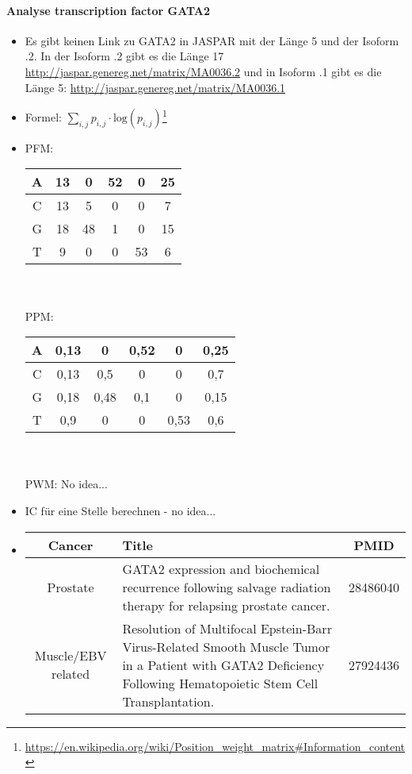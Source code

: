 \documentclass[a4paper,10pt]{article}
\begin{document}
	\parindent0pt
	\paragraph{Analyse transcription factor GATA2}
	\begin{itemize}
		\item Es gibt keinen Link zu GATA2 in JASPAR mit der Länge 5 und der Isoform .2. In der Isoform .2 gibt es die Länge 17 \url{http://jaspar.genereg.net/matrix/MA0036.2} und in Isoform .1 gibt es die Länge 5: \url{http://jaspar.genereg.net/matrix/MA0036.1}
		\item Formel: $\sum_{i,j}p_{i,j} \cdot \text{log}(p_{i,j})$\footnote{\url{https://en.wikipedia.org/wiki/Position_weight_matrix\#Information_content}}
		\item  PFM:	
		\begin{tabular}[t]{|c|c|c|c|c|c|}
			\hline 
			A & 13 & 0 & 52 & 0 & 25 \\ 
			\hline 
			C & 13 & 5 & 0 & 0 & 7 \\ 
			\hline 
			G & 18 & 48 & 1 & 0 & 15 \\ 
			\hline 
			T & 9 & 0 & 0 & 53 & 6 \\ 
			\hline 
		\end{tabular}\ \\\\
		PPM:
		\begin{tabular}[t]{|c|c|c|c|c|c|}
			\hline 
			A & 0,13 & 0 & 0,52 & 0 & 0,25 \\ 
			\hline 
			C & 0,13 & 0,5 & 0 & 0 & 0,7 \\ 
			\hline 
			G & 0,18 & 0,48 & 0,1 & 0 & 0,15 \\ 
			\hline 
			T & 0,9 & 0 & 0 & 0,53 & 0,6 \\ 
			\hline 
		\end{tabular}\ \\\\
		PWM: No idea...
		\item IC für eine Stelle berechnen - no idea...
		\item \begin{tabular}[t]{|c|p{10.5cm}|c|}
			\hline 
			Cancer & Title & PMID \\ 
			\hline 
			Prostate & GATA2 expression and biochemical recurrence following salvage radiation therapy for relapsing prostate cancer. & 28486040 \\ 
			\hline 
			Muscle/EBV related & Resolution of Multifocal Epstein-Barr Virus-Related Smooth Muscle Tumor in a Patient with GATA2 Deficiency Following Hematopoietic Stem Cell Transplantation. & 27924436 \\ 

\end{tabular}
\end{itemize}
\end{document}
